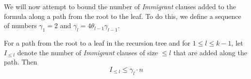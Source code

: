 We will now attempt to bound the number of \textit{Immigrant} clauses added to the formula
along a path from the root to the leaf. To do this, we define a sequence of numbers
$\gamma_1 = 2$ and $\gamma_l = 4 \theta_{l - 1}\gamma_{l-1}$.
\begin{lemma} \label{lem:bound_immigrants}
    For a path from the root to a leaf in the recursion tree and for $1 \leq l \leq k - 1$,
    let $I_{\leq l}$ denote the number of \textit{Immigrant} clauses of size $\leq l$ that are added along the
    path. Then
    \begin{equation}
        I_{\leq l} \leq \gamma_l \cdot n
    \end{equation}
\end{lemma}
%     
